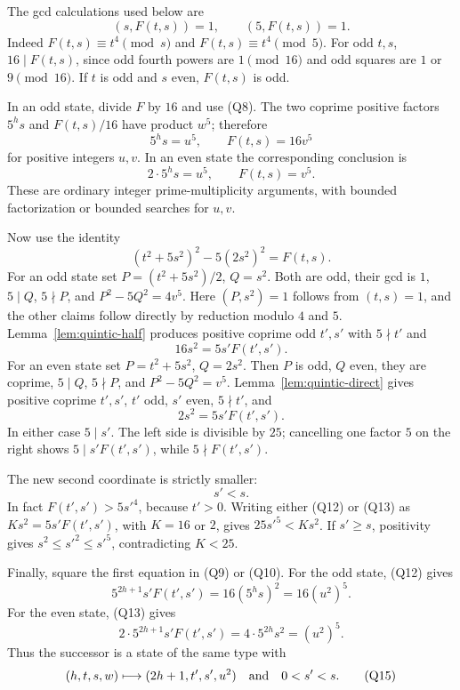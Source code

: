 The gcd calculations used below are
\[
 (s,F(t,s))=1,\qquad (5,F(t,s))=1.
 \tag{Q8}\label{eq:quintic-gcd}
\]
Indeed \(F(t,s)\equiv t^4\pmod s\) and
\(F(t,s)\equiv t^4\pmod5\).
For odd \(t,s\), \(16\mid F(t,s)\), since odd fourth powers are
\(1\pmod {16}\) and odd squares are \(1\) or \(9\pmod {16}\).
If \(t\) is odd and \(s\) even, \(F(t,s)\) is odd.

In an odd state, divide \(F\) by \(16\) and use (Q8).
The two coprime positive factors
\(5^h s\) and \(F(t,s)/16\) have product \(w^5\); therefore
\[
 5^h s=u^5,\qquad F(t,s)=16v^5
 \tag{Q9}\label{eq:quintic-oddsplit}
\]
for positive integers \(u,v\).
In an even state the corresponding conclusion is
\[
 2\cdot5^h s=u^5,\qquad F(t,s)=v^5.
 \tag{Q10}\label{eq:quintic-evensplit}
\]
These are ordinary integer prime-multiplicity arguments, with bounded
factorization or bounded searches for \(u,v\).

Now use the identity
\[
 (t^2+5s^2)^2-5(2s^2)^2=F(t,s).
 \tag{Q11}\label{eq:quintic-normidentity}
\]
For an odd state set \(P=(t^2+5s^2)/2\), \(Q=s^2\).
Both are odd, their gcd is \(1\), \(5\mid Q\), \(5\nmid P\), and
\(P^2-5Q^2=4v^5\).
Here \((P,s^2)=1\) follows from \((t,s)=1\), and the other claims
follow directly by reduction modulo \(4\) and \(5\).
Lemma~\ref{lem:quintic-half} produces positive coprime odd \(t',s'\)
with \(5\nmid t'\) and
\[
 16s^2=5s'F(t',s').
 \tag{Q12}\label{eq:quintic-oddnext}
\]
For an even state set \(P=t^2+5s^2\), \(Q=2s^2\).
Then \(P\) is odd, \(Q\) even, they are coprime, \(5\mid Q\),
\(5\nmid P\), and \(P^2-5Q^2=v^5\).
Lemma~\ref{lem:quintic-direct} gives positive coprime \(t',s'\),
\(t'\) odd, \(s'\) even, \(5\nmid t'\), and
\[
 2s^2=5s'F(t',s').
 \tag{Q13}\label{eq:quintic-evennext}
\]
In either case \(5\mid s'\).  The left side is divisible by \(25\);
cancelling one factor \(5\) on the right shows
\(5\mid s'F(t',s')\), while \(5\nmid F(t',s')\).

The new second coordinate is strictly smaller:
\[
 \boxed{s'<s.}
 \tag{Q14}\label{eq:quintic-decrease}
\]
In fact \(F(t',s')>5s'^4\), because \(t'>0\).
Writing either (Q12) or (Q13) as
\(Ks^2=5s'F(t',s')\), with \(K=16\) or \(2\), gives
\(25s'^5<Ks^2\).
If \(s'\ge s\), positivity gives
\(s^2\le s'^2\le s'^5\), contradicting \(K<25\).

Finally, square the first equation in (Q9) or (Q10).
For the odd state, (Q12) gives
\[
 5^{2h+1}s'F(t',s')
 =16(5^h s)^2
 =16(u^2)^5.
\]
For the even state, (Q13) gives
\[
 2\cdot5^{2h+1}s'F(t',s')
 =4\cdot5^{2h}s^2
 =(u^2)^5.
\]
Thus the successor is a state of the same type with
\[
 (h,t,s,w)\longmapsto(2h+1,t',s',u^2)
 \quad\hbox{and}\quad0<s'<s.
 \tag{Q15}\label{eq:quintic-transition}
\]

